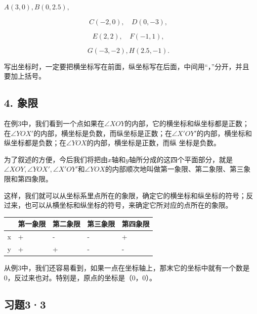  \(A(3,0), B(0,2.5),\)

\[
C (- 2, 0), \quad D (0, - 3),
\]

\[
E (2, 2), \quad F (- 1, 1),
\]

\[
G (- 3, - 2), H (2.5, - 1).
\]

写出坐标时，一定要把横坐标写在前面，纵坐标写在后面，中间用``，''分开，并且要加上括号。

\subsection{4. 象限}

在例3中，我们看到一个点如果在\(\angle XOY\)的内部，它的横坐标和纵坐标都是正数；在\(\angle YOX'\)的内部，横坐标是负数，而纵坐标是正数；在\(\angle X'OY'\)的内部，横坐标和纵坐标都是负数；在\(\angle YOX\)的内部，横坐标是正数，而纵
坐标是负数。

为了叙述的方便，今后我们将把由\(x\)轴和\(y\)轴所分成的这四个平面部分，就是\(\angle XOY, \angle YOX', \angle X'OY'\)和\(\angle YOX\)的内部顺次地叫做第一象限、第二象限、第三象限和第四象限。

这样，我们就可以从坐标系里点所在的象限，确定它的横坐标和纵坐标的符号；反过来，也可以从横坐标和纵坐标的符号，来确定它所对应的点所在的象限。

{\def\LTcaptype{none} %
\begin{longtable}[]{@{}lllll@{}}
\toprule\noalign{}
& 第一象限 & 第二象限 & 第三象限 & 第四象限 \\
\midrule\noalign{}
\endhead
\bottomrule\noalign{}
\endlastfoot
x & + & - & - & + \\
y & + & + & - & - \\
\end{longtable}
}

从例3中，我们还容易看到，如果一点在坐标轴上，那末它的坐标中就有一个数是0，反过来也对。特别是，原点的坐标是（0，0）。

{\centering
\small\setlength{\tabcolsep}{3pt}%
\par
}

\subsection{习题3·3}

